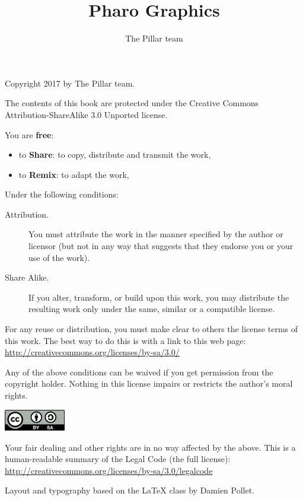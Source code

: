\documentclass[10pt,twoside,english]{_support/latex/sbabook/sbabook}
\title{Pharo Graphics}
\author{The Pillar team}
\begin{document}
\maketitle
\pagestyle{titlingpage}
\thispagestyle{titlingpage} %

\cleartoverso
{\small

  Copyright 2017 by The Pillar team.

  The contents of this book are protected under the Creative Commons
  Attribution-ShareAlike 3.0 Unported license.

  You are \textbf{free}:
  \begin{itemize}
  \item to \textbf{Share}: to copy, distribute and transmit the work,
  \item to \textbf{Remix}: to adapt the work,
  \end{itemize}

  Under the following conditions:
  \begin{description}
  \item[Attribution.] You must attribute the work in the manner specified by the
    author or licensor (but not in any way that suggests that they endorse you
    or your use of the work).
  \item[Share Alike.] If you alter, transform, or build upon this work, you may
    distribute the resulting work only under the same, similar or a compatible
    license.
  \end{description}

  For any reuse or distribution, you must make clear to others the
  license terms of this work. The best way to do this is with a link to
  this web page: \\
  \url{http://creativecommons.org/licenses/by-sa/3.0/}

  Any of the above conditions can be waived if you get permission from
  the copyright holder. Nothing in this license impairs or restricts the
  author's moral rights.

  \begin{center}
    \includegraphics[width=0.2\textwidth]{_support/latex/sbabook/CreativeCommons-BY-SA.pdf}
  \end{center}

  Your fair dealing and other rights are in no way affected by the
  above. This is a human-readable summary of the Legal Code (the full
  license): \\
  \url{http://creativecommons.org/licenses/by-sa/3.0/legalcode}

  \vfill

  Layout and typography based on the  \LaTeX{} class by Damien
  Pollet.
}
\end{document}
